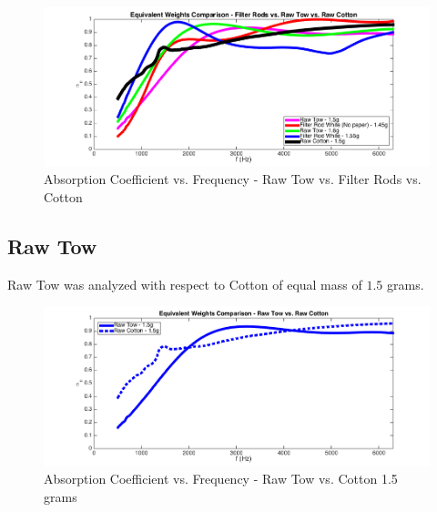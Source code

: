 \begin{figure}[hbtp]
    \centering
    \includegraphics[width=1\textwidth]{Chapter-4/figs/Afigfilterrodscomparerawtowcomparecotton}
    \caption{Absorption Coefficient vs. Frequency - Raw Tow vs. Filter Rods vs. Cotton}
    \label{fig:Afigfilterrodscomparerawtowcomparecotton}
\end{figure}
\clearpage

\subsection{Raw Tow}
Raw Tow was analyzed with respect to Cotton of equal mass of $1.5$ grams.
\begin{figure}[hbtp]
    \centering
    \includegraphics[width=1\textwidth]{Chapter-4/figs/Afigrawtowcomparecotton}
    \caption{Absorption Coefficient vs. Frequency - Raw Tow vs. Cotton 1.5 grams}
    \label{fig:Afigrawtowcomparecotton}
\end{figure}
